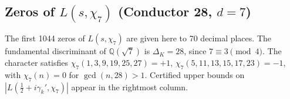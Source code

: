 \documentclass[12pt,reqno]{amsart}
\theoremstyle{remark}
\newcommand{\Q}{\mathbb{Q}}
\begin{document}
\subsection{Zeros of \texorpdfstring{$L(s,\chi_7)$}{L(s,chi7)} (Conductor 28, \texorpdfstring{$d = 7$}{d=7})}
\label{subsec:chi7}

The first 1044 zeros of $L(s,\chi_7)$ are given here to 70 decimal places.  The fundamental discriminant of $\Q(\sqrt{7})$ is $\Delta_K = 28$, since $7 \equiv 3 \pmod{4}$.  The character satisfies $\chi_7(1,3,9,19,25,27) = +1$, $\chi_7(5,11,13,15,17,23) = -1$, with $\chi_7(n) = 0$ for $\gcd(n,28) > 1$.  Certified upper bounds on $|L(\tfrac{1}{2}+i\gamma_k',\chi_7)|$ appear in the rightmost column.

\renewcommand{\arraystretch}{1.1}
\setlength{\LTleft}{\fill}
\setlength{\LTright}{\fill}
\footnotesize
\end{document}
